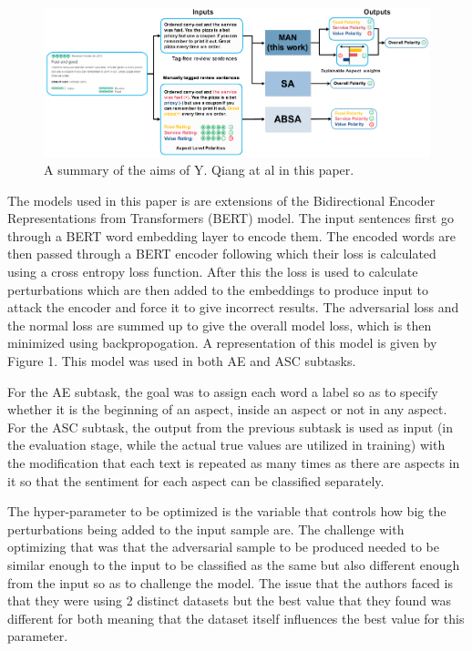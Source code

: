 \documentclass[conference]{IEEEtran}
\begin{document}
\begin{figure}
\centerline{\includegraphics[keepaspectratio, width=\textwidth]{pics/2.png}}
  \caption{A summary of the aims of Y. Qiang at al in this paper.}
\end{figure}

The models used in this paper is are extensions of the Bidirectional Encoder Representations from Transformers (BERT) model. The input sentences first go through a BERT word embedding layer to encode them. The encoded words are then passed through a BERT encoder following which their loss is calculated using a cross entropy loss function. After this the loss is used to calculate perturbations which are then added to the embeddings to produce input to attack the encoder and force it to give incorrect results. The adversarial loss and the normal loss are summed up to give the overall model loss, which is then minimized using backpropogation. A representation of this model is given by Figure 1. This model was used in both AE and ASC subtasks.

For the AE subtask, the goal was to assign each word a label so as to specify whether it is the beginning of an aspect, inside an aspect or not in any aspect. For the ASC subtask, the output from the previous subtask is used as input (in the evaluation stage, while the actual true values are utilized in training) with the modification that each text is repeated as many times as there are aspects in it so that the sentiment for each aspect can be classified separately.

The hyper-parameter to be optimized is the variable that controls how big the perturbations being added to the input sample are. The challenge with optimizing that was that the adversarial sample to be produced needed to be similar enough to the input to be classified as the same but also different enough from the input so as to challenge the model. The issue that the authors faced is that they were using 2 distinct datasets but the best value that they found was different for both meaning that the dataset itself influences the best value for this parameter.
\end{document}
